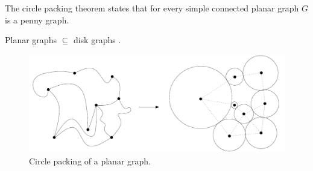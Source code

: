 \begin{theorem}
  The circle packing theorem states that for every simple connected planar graph
  $G$ is a penny graph. \cite{doi:10.1137/0406017}
\end{theorem}

\begin{corollary}
  Planar graphs $\subseteq$ disk graphs \cite{spinradEfficientGraphRepresentations2012}.
\end{corollary}

\begin{figure}
\centering
\includegraphics[width=1.0\textwidth]{res/circle_packing}
\caption{Circle packing of a planar graph. \cite{nachmiasPlanarMapsRandom2016}}
\label{fig:circle}
\end{figure}
